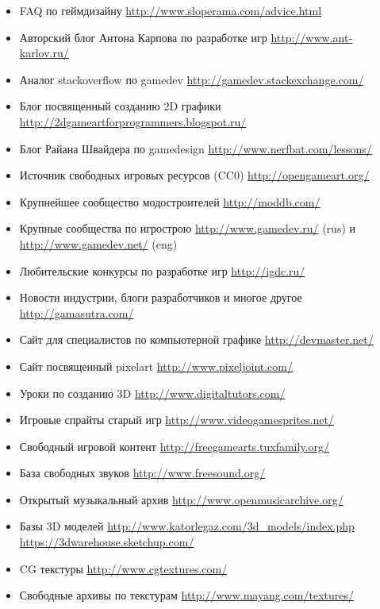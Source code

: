 \begin{itemize}\itemsep-5pt
    \item FAQ по геймдизайну \url{http://www.sloperama.com/advice.html}
    \item Авторский блог Антона Карпова по разработке игр \url{http://www.ant-karlov.ru/}
    \item Аналог stackoverflow по gamedev \url{http://gamedev.stackexchange.com/}
    \item Блог посвященный созданию 2D графики\\
        \url{http://2dgameartforprogrammers.blogspot.ru/}
    \item Блог Райана Швайдера по gamedesign \url{http://www.nerfbat.com/lessons/}
    \item Источник свободных игровых ресурсов (CC0) \url{http://opengameart.org/}
    \item Крупнейшее сообщество модостроителей \url{http://moddb.com/}
    \item Крупные сообщества по игрострою \url{http://www.gamedev.ru/} (rus) и\\
        \url{http://www.gamedev.net/} (eng)
    \item Любительские конкурсы по разработке игр \url{http://igdc.ru/}
    \item Новости индустрии, блоги разработчиков и многое другое \url{http://gamasutra.com/}
    \item Сайт для специалистов по компьютерной графике \url{http://devmaster.net/}
    \item Сайт посвященный pixelart \url{http://www.pixeljoint.com/}
    \item Уроки по созданию 3D \url{http://www.digitaltutors.com/}
    \item Игровые спрайты старый игр \url{http://www.videogamesprites.net/}
    \item Свободный игровой контент \url{http://freegamearts.tuxfamily.org/}
    \item База свободных звуков \url{http://www.freesound.org/}
    \item Открытый музыкальный архив \url{http://www.openmusicarchive.org/}
    \item Базы 3D моделей \url{http://www.katorlegaz.com/3d_models/index.php}\\
        \url{https://3dwarehouse.sketchup.com/}
    \item CG текстуры \url{http://www.cgtextures.com/}
    \item Свободные архивы по текстурам \url{http://www.mayang.com/textures/}\\

\end{itemize}
